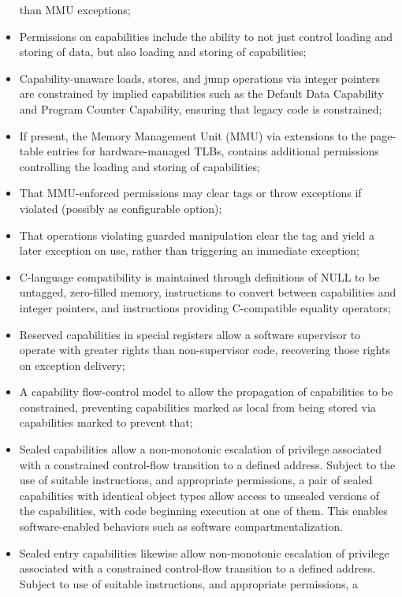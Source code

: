 \begin{itemize}
  than MMU exceptions;
\item Permissions on capabilities include the ability to not just control
  loading and storing of data, but also loading and storing of capabilities;
\item Capability-unaware loads, stores, and jump operations via integer
  pointers are constrained by implied capabilities such as the Default Data
  Capability and Program Counter Capability, ensuring that legacy code is
  constrained;
\item If present, the Memory Management Unit (MMU) via
  extensions to the page-table entries for hardware-managed TLBs, contains
  additional permissions controlling the loading and storing of capabilities;
\item That MMU-enforced permissions may clear tags or throw exceptions if
  violated (possibly as configurable option);
\item That operations violating guarded manipulation clear the tag and yield a
  later exception on use, rather than triggering an immediate exception;
\item C-language compatibility is maintained through definitions of
  NULL to be untagged, zero-filled memory, instructions to convert between
  capabilities and integer pointers, and instructions providing C-compatible
  equality operators;
\item Reserved capabilities in special registers
  allow a software supervisor to operate with greater rights
  than non-supervisor code, recovering those rights on exception delivery;
\item A capability flow-control model to allow the propagation of
  capabilities to be constrained, preventing capabilities marked as local
  from being stored via capabilities marked to prevent that;
\item Sealed capabilities allow a non-monotonic escalation of privilege
  associated with a constrained control-flow transition to a defined address.
  Subject to the use of suitable instructions, and appropriate permissions, a
  pair of sealed capabilities with identical object types allow access to
  unsealed versions of the capabilities, with code beginning execution at one
  of them.
  This enables software-enabled behaviors such as software
  compartmentalization.
\item Sealed entry capabilities likewise allow non-monotonic escalation of
  privilege associated with a constrained control-flow transition to a
  defined address.
  Subject to use of suitable instructions, and appropriate permissions, a

\end{itemize}
